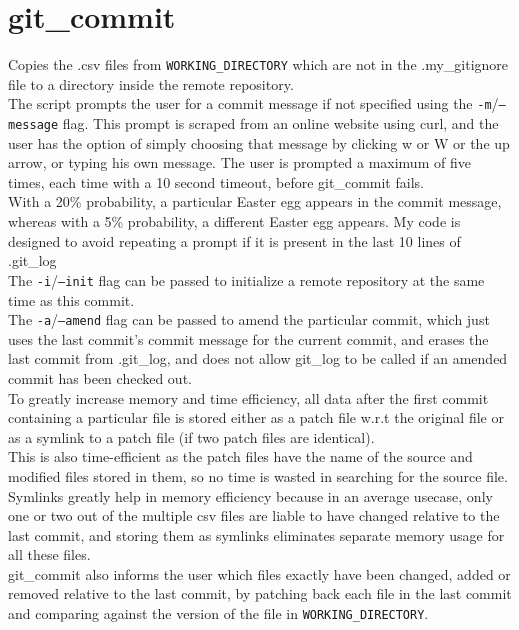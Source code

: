\documentclass{article}
\begin{document}
    \section{git\_commit}
    Copies the .csv files from \texttt{WORKING\_DIRECTORY} which are not in the .my\_gitignore file to a directory inside the remote repository.\\
    The script prompts the user for a commit message if not specified using the \texttt{-m}/\texttt{--message} flag. This prompt is scraped from an online website using curl\cite{url:commit}, and the user has the option of simply choosing that message by clicking w or W or the up arrow, or typing his own message. The user is prompted a maximum of five times, each time with a 10 second timeout, before git\_commit fails.\\
    With a 20\% probability, a particular Easter egg appears in the commit message, whereas with a 5\% probability, a different Easter egg appears. My code is designed to avoid repeating a prompt if it is present in the last 10 lines of .git\_log\\
    The \texttt{-i}/\texttt{--init} flag can be passed to initialize a remote repository at the same time as this commit.\\
    The \texttt{-a}/\texttt{--amend} flag can be passed to amend the particular commit, which just uses the last commit's commit message for the current commit, and erases the last commit from .git\_log, and does not allow git\_log to be called if an amended commit has been checked out.\\
    To greatly increase memory and time efficiency, all data after the first commit containing a particular file is stored either as a patch file w.r.t the original file or as a symlink to a patch file (if two patch files are identical).\\
    This is also time-efficient as the patch files have the name of the source and modified files stored in them, so no time is wasted in searching for the source file.\\
    Symlinks greatly help in memory efficiency because in an average usecase, only one or two out of the multiple csv files are liable to have changed relative to the last commit, and storing them as symlinks eliminates separate memory usage for all these files.\\
    git\_commit also informs the user which files exactly have been changed, added or removed relative to the last commit, by patching back each file in the last commit and comparing against the version of the file in \texttt{WORKING\_DIRECTORY}.
    
\end{document}

